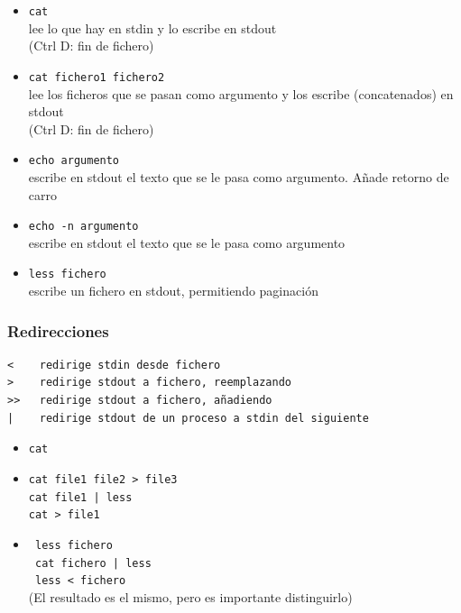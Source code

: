 \documentclass[ucs]{beamer}
\begin{document}
\begin{frame}[fragile]
\begin{itemize} 
\item 
\texttt{cat}\\lee lo que hay en stdin y lo escribe en stdout \\
(Ctrl D: fin de fichero)
\item 
\texttt{cat fichero1 fichero2}\\lee los ficheros que se pasan como argumento y los escribe (concatenados) en stdout\\
(Ctrl D: fin de fichero)

\item 
\texttt{echo argumento}\\escribe en stdout el texto que se le pasa como argumento. Añade retorno de carro 
\item 
\texttt{echo -n argumento}\\escribe en stdout el texto que se le pasa como argumento
\item 
\texttt{less fichero}\\
escribe un fichero en stdout, permitiendo paginación

\end{itemize}
\end{frame}
\begin{frame}[fragile]
\frametitle{Redirecciones}
\begin{verbatim}
<    redirige stdin desde fichero
>    redirige stdout a fichero, reemplazando 
>>   redirige stdout a fichero, añadiendo
|    redirige stdout de un proceso a stdin del siguiente
\end{verbatim}
\begin{itemize} 
\item \texttt{cat }
\item \texttt{cat file1 file2 > file3}\\
 \texttt{cat file1 | less}\\
 \texttt{cat > file1}
\item 
 \texttt{ less fichero }\\
 \texttt{ cat fichero | less}\\
 \texttt{ less < fichero }\\
 (El resultado es el mismo, pero es importante distinguirlo)
\end{itemize}
\end{frame}
\end{document}
